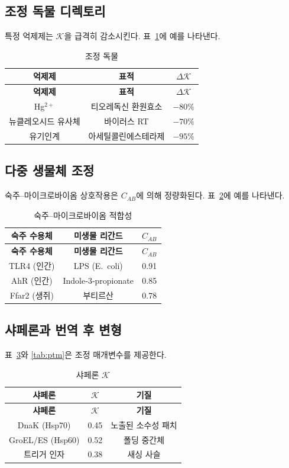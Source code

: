 \documentclass[12pt,a4paper]{article}
\newcommand{\REL}{\mathcal{K}}          %
\begin{document}
	\subsection{조정 독물 디렉토리}
	특정 억제제는 \(\REL\)을 급격히 감소시킨다. 표~\ref{tab:poisons}에 예를 나타낸다.
	
	\begin{longtable}{|c|c|c|}
		\caption{조정 독물}\label{tab:poisons}\\
		\hline
		\textbf{억제제} & \textbf{표적} & \(\Delta \REL\) \\
		\hline
		\endfirsthead
		\hline
		\textbf{억제제} & \textbf{표적} & \(\Delta \REL\) \\
		\hline
		\endhead
		\hline
		Hg\(^{2+}\) & 티오레독신 환원효소 & \(-80\%\) \\
		뉴클레오시드 유사체 & 바이러스 RT & \(-70\%\) \\
		유기인계 & 아세틸콜린에스테라제 & \(-95\%\) \\
		\hline
	\end{longtable}
	
	\subsection{다중 생물체 조정}
	숙주–마이크로바이옴 상호작용은 \(C_{AB}\)에 의해 정량화된다. 표~\ref{tab:microbiome}에 예를 나타낸다.
	
	\begin{longtable}{|c|c|c|}
		\caption{숙주–마이크로바이옴 적합성}\label{tab:microbiome}\\
		\hline
		\textbf{숙주 수용체} & \textbf{미생물 리간드} & \(C_{AB}\) \\
		\hline
		\endfirsthead
		\hline
		\textbf{숙주 수용체} & \textbf{미생물 리간드} & \(C_{AB}\) \\
		\hline
		\endhead
		\hline
		TLR4 (인간) & LPS (E.\ coli) & 0.91 \\
		AhR (인간) & Indole‑3‑propionate & 0.85 \\
		Ffar2 (생쥐) & 부티르산 & 0.78 \\
		\hline
	\end{longtable}
	
	\subsection{샤페론과 번역 후 변형}
	표~\ref{tab:chaperones}와 \ref{tab:ptm}은 조정 매개변수를 제공한다.
	
	\begin{longtable}{|c|c|c|}
		\caption{샤페론 \(\REL\)}\label{tab:chaperones}\\
		\hline
		\textbf{샤페론} & \(\REL\) & \textbf{기질} \\
		\hline
		\endfirsthead
		\hline
		\textbf{샤페론} & \(\REL\) & \textbf{기질} \\
		\hline
		\endhead
		\hline
		DnaK (Hsp70) & 0.45 & 노출된 소수성 패치 \\
		GroEL/ES (Hsp60) & 0.52 & 폴딩 중간체 \\
		트리거 인자 & 0.38 & 새싱 사슬 \\
		\hline
	\end{longtable}
	
\end{document}
